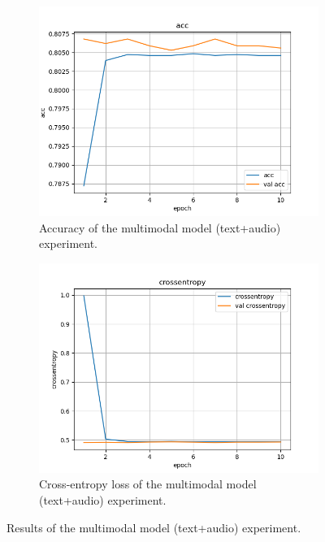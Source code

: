 \documentclass[a4paper]{article}
\begin{document}
\begin{figure}[h]
    \centering
    \begin{subfigure}{0.45\textwidth}
        \includegraphics[width=\textwidth]{../logs/multi_1/acc.png}
        \caption{Accuracy of the multimodal model (text+audio) experiment.}
        \label{fig:multi_1_acc}
    \end{subfigure}
    \hfill
    \begin{subfigure}{0.45\textwidth}
        \includegraphics[width=\textwidth]{../logs/multi_1/crossentropy.png}
        \caption{Cross-entropy loss of the multimodal model (text+audio) experiment.}
        \label{fig:multi_1_loss}
    \end{subfigure}
    \caption{Results of the multimodal model (text+audio) experiment.}
    \label{fig:multi_1_results}
\end{figure}
\end{document}
